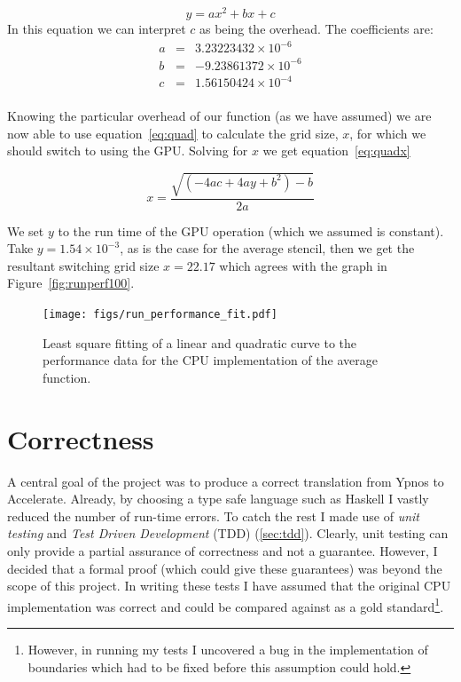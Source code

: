 \documentclass[
    12pt,
    a4paper,
    twoside,
    openright,
    ]{scrbook}
\begin{document}
\begin{equation} \label{eq:quad}
y = a x^2 + b x + c
\end{equation}
In this equation we can interpret $c$ as being the overhead. The coefficients
are:
\begin{align*}
a & = & 3.23223432 \times 10^{-6}\\
b & = & -9.23861372 \times 10^{-6}\\
c & = & 1.56150424 \times 10^{-4}\\
\end{align*}

Knowing the particular overhead of our function (as we have assumed) we are now
able to use equation~\ref{eq:quad} to calculate the grid size, $x$, for which we
should switch to using the GPU. Solving for $x$ we get equation~\ref{eq:quadx}

\begin{equation} \label{eq:quadx}
x = \frac{\sqrt{(-4 a c+4 a y+b^2)-b}}{2 a}
\end{equation}

We set $y$ to the run time of the GPU operation (which we assumed is
constant). Take $y=1.54 \times 10^{-3}$, as is the case for the average stencil,
then we get the resultant switching grid size $x=22.17$ which agrees with the
graph in Figure~\ref{fig:runperf100}.

\begin{figure}[h]
  \texttt{[image: figs/run\_performance\_fit.pdf]}
  \caption{Least square fitting of a linear and quadratic curve to the
    performance data for the CPU implementation of the average function.}
  \label{fig:fitting}
\end{figure}

\section{Correctness}
\label{sec:correctness}

A central goal of the project was to produce a correct translation from Ypnos to
Accelerate. Already, by choosing a type safe language such as Haskell I vastly
reduced the number of run-time errors. To catch the rest I made use of
\emph{unit testing} and \emph{Test Driven Development} (TDD)
(\autoref{sec:tdd}). Clearly, unit testing can only provide a partial assurance
of correctness and not a guarantee. However, I decided that a formal proof
(which could give these guarantees) was beyond the scope of this project. In
writing these tests I have assumed that the original CPU implementation was
correct and could be compared against as a gold standard\footnote{However, in
  running my tests I uncovered a bug in the implementation of boundaries which
  had to be fixed before this assumption could hold.}.
\end{document}
